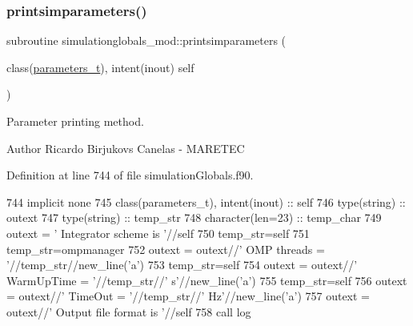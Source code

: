 \subsubsection{\texorpdfstring{printsimparameters()}{printsimparameters()}}
{\footnotesize\ttfamily subroutine simulationglobals\+\_\+mod\+::printsimparameters (\begin{DoxyParamCaption}\item[{class(\mbox{\hyperlink{structsimulationglobals__mod_1_1parameters__t}{parameters\+\_\+t}}), intent(inout)}]{self }\end{DoxyParamCaption})\hspace{0.3cm}{\ttfamily [private]}}



Parameter printing method. 

\begin{DoxyAuthor}{Author}
Ricardo Birjukovs Canelas -\/ M\+A\+R\+E\+T\+EC 
\end{DoxyAuthor}


Definition at line 744 of file simulation\+Globals.\+f90.


\begin{DoxyCode}
744     \textcolor{keywordtype}{implicit none}
745     \textcolor{keywordtype}{class}(parameters\_t), \textcolor{keywordtype}{intent(inout)} :: self
746     \textcolor{keywordtype}{type}(string) :: outext
747     \textcolor{keywordtype}{type}(string) :: temp\_str
748     \textcolor{keywordtype}{character(len=23)} :: temp\_char
749     outext = \textcolor{stringliteral}{'      Integrator scheme is '}//self%
750     temp\_str=self%
751     temp\_str=ompmanager%
752     outext = outext//\textcolor{stringliteral}{'       OMP threads = '}//temp\_str//new\_line(\textcolor{stringliteral}{'a'})
753     temp\_str=self%
754     outext = outext//\textcolor{stringliteral}{'       WarmUpTime = '}//temp\_str//\textcolor{stringliteral}{' s'}//new\_line(\textcolor{stringliteral}{'a'})
755     temp\_str=self%
756     outext = outext//\textcolor{stringliteral}{'       TimeOut = '}//temp\_str//\textcolor{stringliteral}{' Hz'}//new\_line(\textcolor{stringliteral}{'a'})
757     outext = outext//\textcolor{stringliteral}{'       Output file format is '}//self%
758     \textcolor{keyword}{call }log%
\end{DoxyCode}
\mbox{\label{namespacesimulationglobals__mod_af0bc0b00ee3aa2ba9e47dc50daa72799}} 
